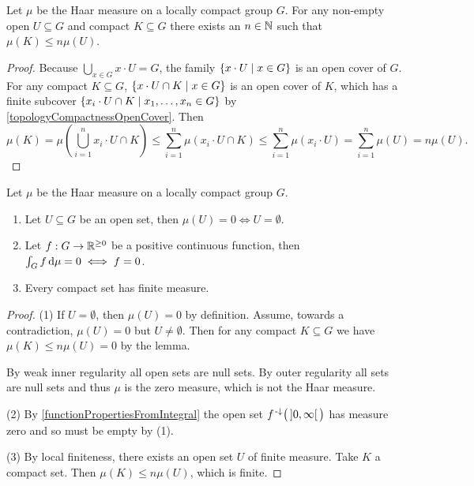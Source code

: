 \begin{lemma}
Let $\mu$ be the Haar measure on a locally compact group $G$. For any non-empty open $U\subseteq G$ and compact $K\subseteq G$ there exists an $n\in \mathbb{N}$ such that $\mu(K)\leq n\mu(U)$.
\end{lemma}
\begin{proof}
Because $\bigcup_{x\in G} x\cdot U = G$, the family $\left\{ x\cdot U \;\middle|\; x\in G \right\}$ is an open cover of $G$. For any compact $K\subseteq G$, $\left\{ x\cdot U \cap K \;\middle|\; x\in G \right\}$ is an open cover of $K$, which has a finite subcover $\left\{ x_i\cdot U \cap K \;\middle|\; x_1,\ldots, x_n \in G \right\}$ by \ref{topologyCompactnessOpenCover}. Then
\[ \mu(K) = \mu\left(\bigcup_{i=1}^n x_i\cdot U \cap K\right) \leq \sum_{i=1}^n \mu(x_i\cdot U \cap K) \leq \sum_{i=1}^n \mu(x_i\cdot U) = \sum_{i=1}^n \mu(U) = n\mu(U). \]
\end{proof}
\begin{corollary} \label{HaarConsequences}
Let $\mu$ be the Haar measure on a locally compact group $G$.
\begin{enumerate}
\item Let $U\subseteq G$ be an open set, then $\mu(U) =0 \iff U = \emptyset$.
\item Let $f: G\to \mathbb{R}^{\geq 0}$ be a positive continuous function, then $\int_G f \operatorname{d \!}{\mu} = 0 \iff f= 0$.
\item Every compact set has finite measure.
\end{enumerate}
\end{corollary}
\begin{proof}
(1) If $U = \emptyset$, then $\mu(U) = 0$ by definition. Assume, towards a contradiction, $\mu(U) = 0$ but $U \neq \emptyset$. Then for any compact $K\subseteq G$ we have $\mu(K) \leq n\mu(U) = 0$ by the lemma.

By weak inner regularity all open sets are null sets. By outer regularity all sets are null sets and thus $\mu$ is the zero measure, which is not the Haar measure.

(2) By \ref{functionPropertiesFromIntegral} the open set $f^{\text{\hspace{0.15em}-}\downarrow}\big(\,]0, \infty[\,\big)$ has measure zero and so must be empty by (1).

(3) By local finiteness, there exists an open set $U$ of finite measure. Take $K$ a compact set. Then $\mu(K) \leq n\mu(U)$, which is finite.
\end{proof}

